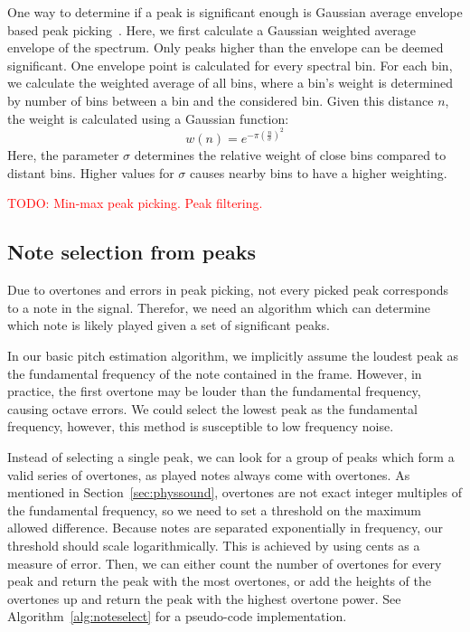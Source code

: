 \documentclass[a4paper,10pt,twocolumn]{article}
\begin{document}
One way to determine if a peak is significant enough is Gaussian average envelope based peak picking~\cite{gausvelope}. Here, we first calculate a Gaussian weighted average envelope of the spectrum. Only peaks higher than the envelope can be deemed significant. One envelope point is calculated for every spectral bin. For each bin, we calculate the weighted average of all bins, where a bin's weight is determined by number of bins between a bin and the considered bin. Given this distance $n$, the weight is calculated using a Gaussian function:
\[ w(n) = e^{-\pi (\frac{n}{\sigma})^2} \]
Here, the parameter $\sigma$ determines the relative weight of close bins compared to distant bins. Higher values for $\sigma$ causes nearby bins to have a higher weighting.

\textcolor{red}{TODO: Min-max peak picking. Peak filtering.}


\subsection{Note selection from peaks}
Due to overtones and errors in peak picking, not every picked peak corresponds to a note in the signal. Therefor, we need an algorithm which can determine which note is likely played given a set of significant peaks.

In our basic pitch estimation algorithm, we implicitly assume the loudest peak as the fundamental frequency of the note contained in the frame. However, in practice, the first overtone may be louder than the fundamental frequency, causing octave errors. We could select the lowest peak as the fundamental frequency, however, this method is susceptible to low frequency noise.

Instead of selecting a single peak, we can look for a group of peaks which form a valid series of overtones, as played notes always come with overtones. As mentioned in Section~\ref{sec:physsound}, overtones are not exact integer multiples of the fundamental frequency, so we need to set a threshold on the maximum allowed difference. Because notes are separated exponentially in frequency, our threshold should scale logarithmically. This is achieved by using cents as a measure of error. Then, we can either count the number of overtones for every peak and return the peak with the most overtones, or add the heights of the overtones up and return the peak with the highest overtone power. See Algorithm~\ref{alg:noteselect} for a pseudo-code implementation.

\end{document}
